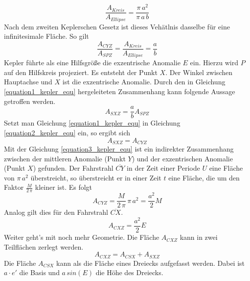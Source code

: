 \begin{equation}
	\frac{A_{Kreis}}{A_{Ellipse}}=\frac{\pi\,a^2}{\pi\,a\,b}
\end{equation}
Nach dem zweiten Keplerschen Gesetz ist dieses Vehätlnis dasselbe für eine infinitesimale Fläche. So gilt
\begin{equation}
	\frac{A_{CYZ}}{A_{SPZ}}=\frac{A_{Kreis}}{A_{Ellipse}}=\frac{a}{b}
	\label{equation1_kepler_equ}
\end{equation}
\newpar
Kepler führte als eine Hilfsgröße die exzentrische Anomalie \ensuremath{E} ein. Hierzu wird \ensuremath{P} auf den Hilfskreis projeziert. Es entsteht der Punkt \ensuremath{X}. Der Winkel zwischen Hauptachse und \ensuremath{X} ist die exzentrische Anomalie. Durch den in Gleichung \ref{equation1_kepler_equ} hergeleiteten Zusammenhang kann folgende Aussage getroffen werden. 
\begin{equation}
	A_{SXZ}=\frac{a}{b}A_{SPZ}	
	\label{equation2_kepler_equ}
\end{equation}  
Setzt man Gleichung \ref{equation1_kepler_equ} in Gleichung \ref{equation2_kepler_equ} ein, so ergibt sich
\begin{equation}
	A_{SXZ}=A_{CYZ}	
	\label{equation3_kepler_equ}
\end{equation}
Mit der Gleichung \ref{equation3_kepler_equ} ist ein indirekter Zusammenhang zwischen der mittleren Anomalie (Punkt \ensuremath{Y}) und der exzentrischen Anomalie (Punkt \ensuremath{X}) gefunden. Der Fahrstrahl \ensuremath{\overline{CY}} in der Zeit einer Periode \ensuremath{U} eine Fläche von \ensuremath{\pi\,a^2} überstreicht, so überstreicht er in einer Zeit \ensuremath{t} eine Fläche, die um den Faktor \ensuremath{\frac{M}{2\,\pi}} kleiner ist. Es folgt 
\begin{equation}
	A_{CYZ}=\frac{M}{2\,\pi}\,\pi\,a^2=\frac{a^2}{2}M	
	\label{equation4_kepler_equ}
\end{equation}  
Analog gilt dies für den Fahrstrahl \ensuremath{\overline{CX}}.
\begin{equation}
	A_{CXZ}=\frac{a^2}{2}E	
	\label{equation5_kepler_equ}
\end{equation}
Weiter geht's mit noch mehr Geometrie. Die Fläche \ensuremath{A_{CXZ}} kann in zwei Teilflächen zerlegt werden.
\begin{equation}
	A_{CXZ}=A_{CSX}+A_{SXZ}
	\label{equation6_kepler_equ}
\end{equation}
Die Fläche \ensuremath{A_{CSX}} kann als die Fläche eines Dreiecks aufgefasst werden. Dabei ist \ensuremath{a\cdot e'} die Basis und \ensuremath{a\,sin(E)} die Höhe des Dreiecks. 
